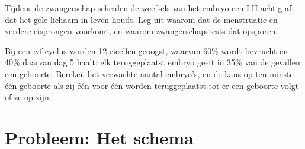 \begin{exercise}[$\star\star\star$]\label{exo:g11:hormones-and-reproduction:14}
Tijdens de zwangerschap scheiden de weefsels van het embryo een
LH-achtig  af dat het gele lichaam in leven houdt. Leg uit waarom
dat de menstruatie en verdere eisprongen voorkomt, en waarom
zwangerschapstests dat  opsporen.
\end{exercise}

\begin{exercise}[$\star\star\star$]\label{exo:g11:hormones-and-reproduction:15}
Bij een ivf-cyclus worden 12 eicellen geoogst, waarvan 60\% wordt
bevrucht en 40\% daarvan dag 5 haalt; elk teruggeplaatst embryo geeft in
35\% van de gevallen een geboorte. Bereken het verwachte aantal embryo's,
en de kans op ten minste één geboorte als zij één voor één worden
teruggeplaatst tot er een geboorte volgt of ze op zijn.
\end{exercise}

\section{Probleem: Het schema}

